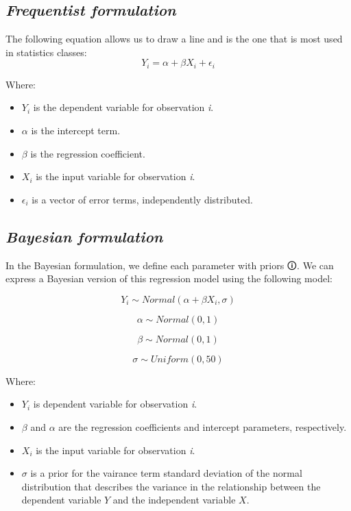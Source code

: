 \documentclass[
  letterpaper,
  DIV=11,
  numbers=noendperiod]{scrreprt}
\begin{document}
\subsection{\texorpdfstring{\emph{Frequentist
formulation}}{Frequentist formulation}}\label{frequentist-formulation}

The following equation allows us to draw a line and is the one that is
most used in statistics classes: \[
Y_i = \alpha + \beta  X_i + \epsilon_i
\]

Where:

\begin{itemize}
\item
  \(Y_i\) is the dependent variable for observation \emph{i}.
\item
  \(\alpha\) is the intercept term.
\item
  \(\beta\) is the regression coefficient.
\item
  \(X_i\) is the input variable for observation \emph{i}.
\item
  \(\epsilon_i\) is a vector of error terms, independently distributed.
\end{itemize}

\subsection{\texorpdfstring{\emph{Bayesian
formulation}}{Bayesian formulation}}\label{bayesian-formulation}

In the Bayesian formulation, we define each parameter with
\label{prior}{{priors 🛈}}. We can express a Bayesian
version of this regression model using the following model:

\[
Y_i \sim Normal(\alpha + \beta   X_i, \sigma)
\]

\[
\alpha \sim Normal(0, 1)
\]

\[
\beta \sim Normal(0, 1)
\]

\[
\sigma \sim Uniform(0, 50)
\]

Where:

\begin{itemize}
\item
  \(Y_i\) is dependent variable for observation \emph{i}.
\item
  \(\beta\) and \(\alpha\) are the regression coefficients and intercept
  parameters, respectively.
\item
  \(X_i\) is the input variable for observation \emph{i}.
\item
  \(\sigma\) is a prior for the vairance term standard deviation of the
  normal distribution that describes the variance in the relationship
  between the dependent variable \(Y\) and the independent variable
  \(X\).
\end{itemize}
\end{document}
